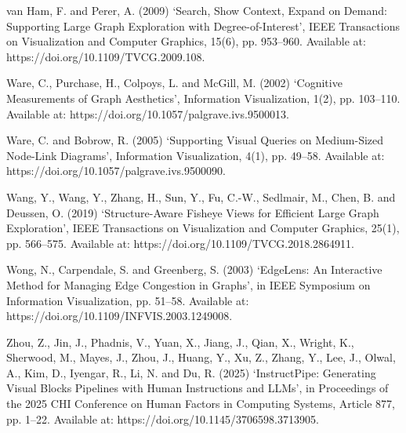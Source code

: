 van Ham, F. and Perer, A. (2009) ‘Search, Show Context, Expand on Demand: Supporting Large Graph Exploration with Degree-of-Interest’, IEEE Transactions on Visualization and Computer Graphics, 15(6), pp. 953–960. Available at: https://doi.org/10.1109/TVCG.2009.108.

Ware, C., Purchase, H., Colpoys, L. and McGill, M. (2002) ‘Cognitive Measurements of Graph Aesthetics’, Information Visualization, 1(2), pp. 103–110. Available at: https://doi.org/10.1057/palgrave.ivs.9500013.

Ware, C. and Bobrow, R. (2005) ‘Supporting Visual Queries on Medium-Sized Node-Link Diagrams’, Information Visualization, 4(1), pp. 49–58. Available at: https://doi.org/10.1057/palgrave.ivs.9500090.

Wang, Y., Wang, Y., Zhang, H., Sun, Y., Fu, C.-W., Sedlmair, M., Chen, B. and Deussen, O. (2019) ‘Structure-Aware Fisheye Views for Efficient Large Graph Exploration’, IEEE Transactions on Visualization and Computer Graphics, 25(1), pp. 566–575. Available at: https://doi.org/10.1109/TVCG.2018.2864911.

Wong, N., Carpendale, S. and Greenberg, S. (2003) ‘EdgeLens: An Interactive Method for Managing Edge Congestion in Graphs’, in IEEE Symposium on Information Visualization, pp. 51–58. Available at: https://doi.org/10.1109/INFVIS.2003.1249008.

Zhou, Z., Jin, J., Phadnis, V., Yuan, X., Jiang, J., Qian, X., Wright, K., Sherwood, M., Mayes, J., Zhou, J., Huang, Y., Xu, Z., Zhang, Y., Lee, J., Olwal, A., Kim, D., Iyengar, R., Li, N. and Du, R. (2025) ‘InstructPipe: Generating Visual Blocks Pipelines with Human Instructions and LLMs’, in Proceedings of the 2025 CHI Conference on Human Factors in Computing Systems, Article 877, pp. 1–22. Available at: https://doi.org/10.1145/3706598.3713905.
